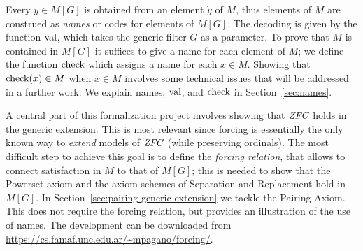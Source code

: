%
Every  $y \in M[G]$ is obtained from an element $\dot y$ of $M$, thus
elements of $M$ are construed as \emph{names} or codes for elements of
$M[G]$.
The decoding is given by the function
$\operatorname{val}$, which takes the generic filter $G$ as a parameter. To
prove that $M$ is contained in $M[G]$ it suffices to give a name for
each element of $M$; we define the function $\operatorname{check}$ which assigns
a name for each $x\in M$. Showing that $\operatorname{check}(x)\in M$
when $x\in M$ involves some technical issues that will
be addressed in a further work. We explain names, $\operatorname{val}$, and
$\operatorname{check}$ in Section~\ref{sec:names}.

A central part of this formalization project involves showing that
$\mathit{ZFC}$ holds in the generic extension. This is most relevant since
forcing is essentially the only known way to \emph{extend} models of
$\mathit{ZFC}$ (while preserving ordinals). The most difficult step to achieve
this goal is to define the \emph{forcing relation}, that allows to
connect satisfaction in $M$ to that of $M[G]$; this is needed to show
that the Powerset axiom and the axiom schemes of Separation and
Replacement hold in $M[G]$. In
Section~\ref{sec:pairing-generic-extension}
 we tackle the Pairing
Axiom. This does not require the forcing relation, but provides an
illustration of the use of names. The development can be downloaded
from \url{https://cs.famaf.unc.edu.ar/~mpagano/forcing/}.
   
%

%
%
%
%
%
